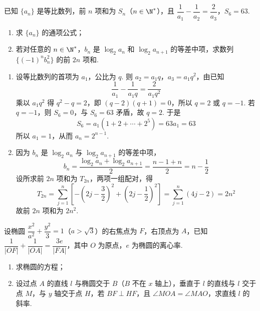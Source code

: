 \begin{problem}
已知 \( \{a_n\} \) 是等比数列，前 \( n \) 项和为 \( S_n \)（\( n\in \N^* \)），且 \( \dfrac{1}{a_1}-\dfrac{1}{a_2}=\dfrac{2}{a_3} \)，\( S_6=63 \).

\begin{enumerate}
\item 求 \( \{a_n\} \) 的通项公式；
\item 若对任意的 \( n\in \N^* \)，\( b_n \) 是 \( \log_2 a_n \) 和 \( \log_2 a_{n+1} \) 的等差中项，求数列 \( \{(-1)^n b_n^2\} \) 的前 \( 2n \) 项和.
\end{enumerate}
\end{problem}

\begin{solution}
\begin{enumerate}
\item 设等比数列的首项为 \(a_1\)，公比为 \(q\). 则
\(a_2=a_1q\)，\(a_3=a_1q^2\)，由已知
\[
\dfrac1{a_1}-\dfrac1{a_1q}=\dfrac2{a_1q^2}
\]
乘以 \(a_1q^2\) 得 \(q^2-q=2\)，即
\((q-2)(q+1)=0\)，所以 \(q=2\) 或 \(q=-1\). 若 \(q=-1\)，则
\(S_6=0\)，与 \(S_6=63\) 矛盾，故 \(q=2\). 于是
\[
S_6=a_1(1+2+\cdots+2^5)=63a_1=63
\]
所以 \(a_1=1\)，从而
\(a_n=2^{n-1}\).

\item 因为 \(b_n\) 是 \(\log_2a_n\) 与 \(\log_2a_{n+1}\) 的等差中项，
\[
b_n=\dfrac{\log_2a_n+\log_2a_{n+1}}2
=\dfrac{n-1+n}{2}=n-\dfrac12
\]
设所求前 \(2n\) 项和为 \(T_{2n}\)，两项一组配对，得
\[
T_{2n}=\sum_{j=1}^{n}\left[-\left(2j-\dfrac32\right)^2
+\left(2j-\dfrac12\right)^2\right]
=\sum_{j=1}^{n}(4j-2)=2n^2
\]
故前 \(2n\) 项和为 \(2n^2\).
\end{enumerate}
\end{solution}

\begin{problem}
设椭圆 \( \dfrac{x^2}{a^2}+\dfrac{y^2}{3}=1 \)（\( a>\sqrt3 \)）的右焦点为 \(F\)，右顶点为 \(A\)，已知 \( \dfrac1{|OF|}+\dfrac1{|OA|}=\dfrac{3e}{|FA|} \)，其中 \(O\) 为原点，\( e \) 为椭圆的离心率.

\begin{enumerate}
\item 求椭圆的方程；
\item 设过点 \(A\) 的直线 \( l \) 与椭圆交于 \(B\)（\(B\) 不在 \( x \) 轴上），垂直于 \( l \) 的直线与 \( l \) 交于点 \(M\)，与 \( y \) 轴交于点 \(H\)，若 \( BF\perp HF \)，且 \( \angle MOA=\angle MAO \)，求直线 \( l \) 的斜率.
\end{enumerate}
\end{problem}

